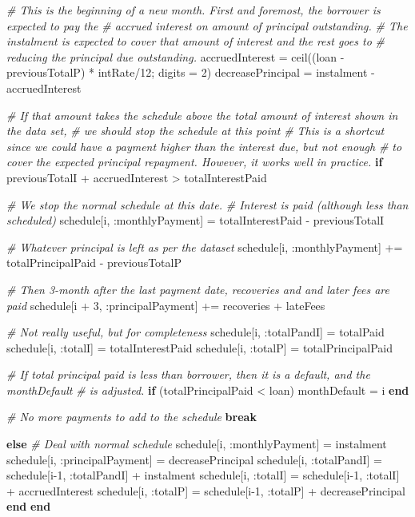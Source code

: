 \documentclass[11pt,]{report}
\newenvironment{Shaded}{\begin{snugshade}}{\end{snugshade}}
\newcommand{\CommentTok}[1]{\textcolor[rgb]{0.56,0.35,0.01}{\textit{#1}}}
\newcommand{\FloatTok}[1]{\textcolor[rgb]{0.00,0.00,0.81}{#1}}
\newcommand{\KeywordTok}[1]{\textcolor[rgb]{0.13,0.29,0.53}{\textbf{#1}}}
\newcommand{\NormalTok}[1]{#1}
\begin{document}
\begin{Shaded}
\begin{Highlighting}[numbers=left,,]
{{    \CommentTok{# This is the beginning of a new month. First and foremost, the borrower is expected to pay the}
    \CommentTok{# accrued interest on amount of principal outstanding.}
    \CommentTok{# The instalment is expected to cover that amount of interest and the rest goes to}
    \CommentTok{# reducing the principal due outstanding.}
\NormalTok{    accruedInterest = ceil((loan - previousTotalP) * intRate/}\FloatTok{12}\NormalTok{; digits = }\FloatTok{2}\NormalTok{)}
\NormalTok{    decreasePrincipal = instalment - accruedInterest}

    \CommentTok{# If that amount takes the schedule above the total amount of interest shown in the data set,}
    \CommentTok{# we should stop the schedule at this point}
    \CommentTok{# This is a shortcut since we could have a payment higher than the interest due, but not enough}
    \CommentTok{# to cover the expected principal repayment. However, it works well in practice.}
    \KeywordTok{if}\NormalTok{ previousTotalI + accruedInterest > totalInterestPaid}

      \CommentTok{# We stop the normal schedule at this date.}
      \CommentTok{# Interest is paid (although less than scheduled)}
\NormalTok{      schedule[i, :monthlyPayment] = totalInterestPaid - previousTotalI}

      \CommentTok{# Whatever principal is left as per the dataset}
\NormalTok{      schedule[i, :monthlyPayment] += totalPrincipalPaid - previousTotalP}

      \CommentTok{# Then 3-month after the last payment date, recoveries and and later fees are paid}
\NormalTok{      schedule[i + }\FloatTok{3}\NormalTok{, :principalPayment] += recoveries + lateFees}

      \CommentTok{# Not really useful, but for completeness}
\NormalTok{      schedule[i, :totalPandI] = totalPaid}
\NormalTok{      schedule[i, :totalI]     = totalInterestPaid}
\NormalTok{      schedule[i, :totalP]     = totalPrincipalPaid}

      \CommentTok{# If total principal paid is less than borrower, then it is a default, and the monthDefault}
      \CommentTok{# is adjusted.}
      \KeywordTok{if}\NormalTok{ (totalPrincipalPaid < loan)}
\NormalTok{        monthDefault = i}
      \KeywordTok{end}

      \CommentTok{# No more payments to add to the schedule}
      \KeywordTok{break}

    \KeywordTok{else}
      \CommentTok{# Deal with normal schedule}
\NormalTok{      schedule[i, :monthlyPayment]   = instalment}
\NormalTok{      schedule[i, :principalPayment] = decreasePrincipal}
\NormalTok{      schedule[i, :totalPandI]       = schedule[i-}\FloatTok{1}\NormalTok{, :totalPandI] + instalment}
\NormalTok{      schedule[i, :totalI]           = schedule[i-}\FloatTok{1}\NormalTok{, :totalI]     + accruedInterest}
\NormalTok{      schedule[i, :totalP]           = schedule[i-}\FloatTok{1}\NormalTok{, :totalP]     + decreasePrincipal}
    \KeywordTok{end}
  \KeywordTok{end}

}}
\end{Highlighting}
\end{Shaded}
\end{document}
